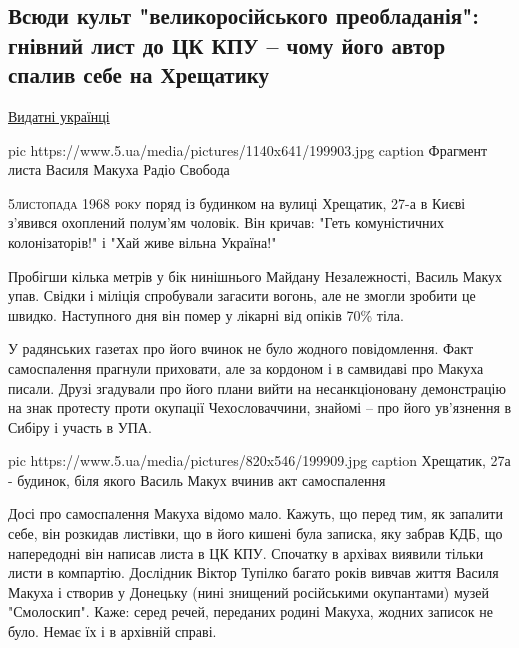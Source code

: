  
 
 

\subsection{Всюди культ "великоросійського преобладанія": гнівний лист до ЦК КПУ – чому його автор спалив себе на Хрещатику}
\href{https://www.5.ua/spetstemy/154/}{Видатні українці}


\ifcmt
pic https://www.5.ua/media/pictures/1140x641/199903.jpg
caption Фрагмент листа Василя Макуха Радіо Свобода
\fi

\lettrine[lines=3]{5}{листопада 1968 року} поряд із будинком на вулиці Хрещатик, 27-а в Києві
з'явився охоплений полум'ям чоловік. Він кричав: "Геть комуністичних
колонізаторів!" і "Хай живе вільна Україна!"

Пробігши кілька метрів у бік нинішнього Майдану Незалежності, Василь Макух
упав. Свідки і міліція спробували загасити вогонь, але не змогли зробити це
швидко. Наступного дня він помер у лікарні від опіків 70\% тіла.

У радянських газетах про його вчинок не було жодного повідомлення. Факт
самоспалення прагнули приховати, але за кордоном і в самвидаві про
Макуха писали. Друзі згадували про його плани вийти на несанкціоновану
демонстрацію на знак протесту проти окупації Чехословаччини, знайомі –
про його ув'язнення в Сибіру і участь в УПА.

\ifcmt
pic https://www.5.ua/media/pictures/820x546/199909.jpg
caption Хрещатик, 27а - будинок, біля якого Василь Макух вчинив акт самоспалення 
\fi

Досі про самоспалення Макуха відомо мало. Кажуть, що перед тим, як запалити
себе, він розкидав листівки, що в його кишені була записка, яку забрав КДБ, що
напередодні він написав листа в ЦК КПУ. Спочатку в архівах виявили тільки листи
в компартію. Дослідник Віктор Тупілко багато років вивчав життя Василя Макуха і
створив у Донецьку (нині знищений російськими окупантами) музей "Смолоскип".
Каже: серед речей, переданих родині Макуха, жодних записок не було. Немає їх і
в архівній справі.

